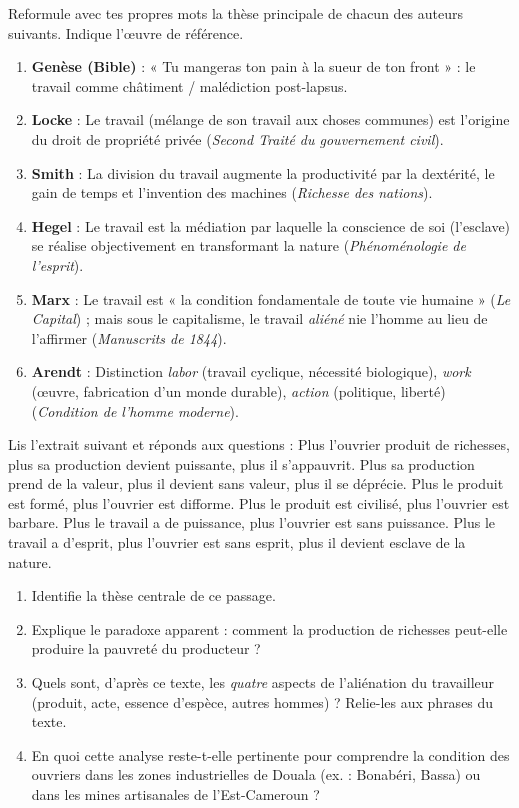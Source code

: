 \documentclass[11pt]{article}
\begin{document}
\begin{exercice}
Reformule avec tes propres mots la thèse principale de chacun des auteurs suivants. Indique l'œuvre de référence.
\begin{enumerate}
\item \textbf{Genèse (Bible)} : « Tu mangeras ton pain à la sueur de ton front » : le travail comme châtiment / malédiction post-lapsus.
\item \textbf{Locke} : Le travail (mélange de son travail aux choses communes) est l'origine du droit de propriété privée (\emph{Second Traité du gouvernement civil}).
\item \textbf{Smith} : La division du travail augmente la productivité par la dextérité, le gain de temps et l'invention des machines (\emph{Richesse des nations}).
\item \textbf{Hegel} : Le travail est la médiation par laquelle la conscience de soi (l'esclave) se réalise objectivement en transformant la nature (\emph{Phénoménologie de l'esprit}).
\item \textbf{Marx} : Le travail est « la condition fondamentale de toute vie humaine » (\emph{Le Capital}) ; mais sous le capitalisme, le travail \emph{aliéné} nie l'homme au lieu de l'affirmer (\emph{Manuscrits de 1844}).
\item \textbf{Arendt} : Distinction \emph{labor} (travail cyclique, nécessité biologique), \emph{work} (œuvre, fabrication d'un monde durable), \emph{action} (politique, liberté) (\emph{Condition de l'homme moderne}).
\end{enumerate}
\end{exercice}

\begin{exercice}
Lis l'extrait suivant et réponds aux questions :
\guillemotleft Plus l'ouvrier produit de richesses, plus sa production devient puissante, plus il s'appauvrit. Plus sa production prend de la valeur, plus il devient sans valeur, plus il se déprécie. Plus le produit est formé, plus l'ouvrier est difforme. Plus le produit est civilisé, plus l'ouvrier est barbare. Plus le travail a de puissance, plus l'ouvrier est sans puissance. Plus le travail a d'esprit, plus l'ouvrier est sans esprit, plus il devient esclave de la nature. \guillemotright
\begin{enumerate}
\item Identifie la thèse centrale de ce passage.
\item Explique le paradoxe apparent : comment la production de richesses peut-elle produire la pauvreté du producteur ?
\item Quels sont, d'après ce texte, les \emph{quatre} aspects de l'aliénation du travailleur (produit, acte, essence d'espèce, autres hommes) ? Relie-les aux phrases du texte.
\item En quoi cette analyse reste-t-elle pertinente pour comprendre la condition des ouvriers dans les zones industrielles de Douala (ex. : Bonabéri, Bassa) ou dans les mines artisanales de l'Est-Cameroun ?
\end{enumerate}
\end{exercice}
\end{document}
